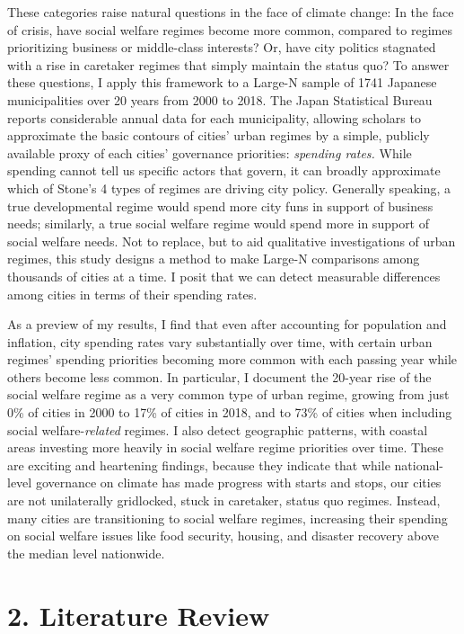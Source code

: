 \documentclass[preprint, 3p,
authoryear]{elsarticle} %
\begin{document}
These categories raise natural questions in the face of climate change:
In the face of crisis, have social welfare regimes become more common,
compared to regimes prioritizing business or middle-class interests? Or,
have city politics stagnated with a rise in caretaker regimes that
simply maintain the status quo? To answer these questions, I apply this
framework to a Large-N sample of 1741 Japanese municipalities over 20
years from 2000 to 2018. The Japan Statistical Bureau reports
considerable annual data for each municipality, allowing scholars to
approximate the basic contours of cities' urban regimes by a simple,
publicly available proxy of each cities' governance priorities:
\emph{spending rates.} While spending cannot tell us specific actors
that govern, it can broadly approximate which of Stone's
\citeyearpar{stone_1993} 4 types of regimes are driving city policy.
Generally speaking, a true developmental regime would spend more city
funs in support of business needs; similarly, a true social welfare
regime would spend more in support of social welfare needs. Not to
replace, but to aid qualitative investigations of urban regimes, this
study designs a method to make Large-N comparisons among thousands of
cities at a time. I posit that we can detect measurable differences
among cities in terms of their spending rates.

As a preview of my results, I find that even after accounting for
population and inflation, city spending rates vary substantially over
time, with certain urban regimes' spending priorities becoming more
common with each passing year while others become less common. In
particular, I document the 20-year rise of the social welfare regime as
a very common type of urban regime, growing from just 0\% of cities in
2000 to 17\% of cities in 2018, and to 73\% of cities when including
social welfare-\emph{related} regimes. I also detect geographic
patterns, with coastal areas investing more heavily in social welfare
regime priorities over time. These are exciting and heartening findings,
because they indicate that while national-level governance on climate
has made progress with starts and stops, our cities are not unilaterally
gridlocked, stuck in caretaker, status quo regimes. Instead, many cities
are transitioning to social welfare regimes, increasing their spending
on social welfare issues like food security, housing, and disaster
recovery above the median level nationwide.

\hypertarget{literature-review}{%
\section{2. Literature Review}\label{literature-review}}
\end{document}
